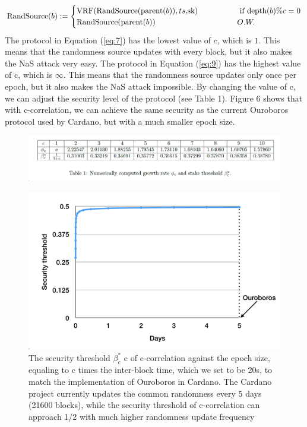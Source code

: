 \begin{align}
    \text{RandSource}(b) := \begin{cases}
        \text{VRF}(\text{RandSource}(\text{parent}(b)), ts, $sk$) \qquad\qquad & \text{ if } \text{depth}(b) \% c = 0\\
        \text{RandSource}(\text{parent}(b)) & O.W. 
    \end{cases}
\end{align}
The protocol in Equation (\ref{eq:7}) has the lowest value of $c$, which is $1$. This means that the randomness source updates with every block, but it also makes the NaS attack very easy. The protocol in Equation (\ref{eq:9}) has the highest value of c, which is $\infty$. This means that the randomness source updates only once per epoch, but it also makes the NaS attack impossible. By changing the value of c, we can adjust the security level of the protocol (see Table 1). Figure 6 shows that with c-correlation, we can achieve the same security as the current Ouroboros protocol used by Cardano, but with a much smaller epoch size.
\begin{figure}[h!]
    \centering
    \includegraphics[width=\linewidth]{Fig/11/F6}
\end{figure}
\begin{figure}[h!]
    \centering
    \includegraphics[width=0.5\linewidth]{Fig/11/F7}
    \caption{The security threshold $\beta_c^*$
        c of c-correlation against the epoch size, equaling to c times the
        inter-block time, which we set to be 20s, to match the implementation of Ouroboros in Cardano. The
        Cardano project currently updates the common randomness every 5 days (21600 blocks), while the
        security threshold of c-correlation can approach 1/2 with much higher randomness update frequency}
    \label{fig:f7}
\end{figure}

